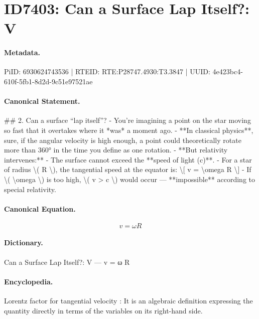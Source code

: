 \section*{ID7403: Can a Surface Lap Itself?: V}
\paragraph{Metadata.}
PiID: 6930624743536 | RTEID: RTE:P28747.4930:T3.3847 | UUID: 4e423bc4-610f-5fb1-8d2d-9c51e97521ae

\paragraph{Canonical Statement.}
\#\# 2. Can a surface “lap itself”? - You’re imagining a point on the star moving so fast that it overtakes where it *was* a moment ago. - **In classical physics**, sure, if the angular velocity is high enough, a point could theoretically rotate more than 360° in the time you define as one rotation. - **But relativity intervenes:** - The surface cannot exceed the **speed of light (c)**. - For a star of radius \textbackslash{}( R \textbackslash{}), the tangential speed at the equator is: \textbackslash{}[ v = \textbackslash{}omega R \textbackslash{}] - If \textbackslash{}( \textbackslash{}omega \textbackslash{}) is too high, \textbackslash{}( v > c \textbackslash{}) would occur — **impossible** according to special relativity.

\paragraph{Canonical Equation.}
\[
v = \omega R
\]

\paragraph{Dictionary.}
Can a Surface Lap Itself?: V — v = ω R

\paragraph{Encyclopedia.}
Lorentz factor for tangential velocity : It is an algebraic definition expressing the quantity directly in terms of the variables on its right-hand side.
